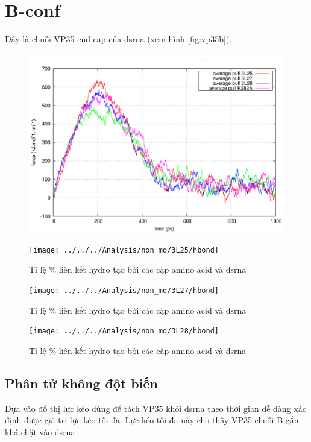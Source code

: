 \documentclass[12pt,a4paper,reqno, oneside]{book}
\begin{document}
\section{B-conf}
Đây là chuỗi VP35 end-cap của \gls{dsrna} (xem hình \ref{fig:vp35b}).
	\begin{figure}[b!]
	\centering
	\includegraphics[width=1.0\textwidth,natwidth=610,natheight=642]{pullf}
	\caption{}
	\end{figure}

	\begin{figure}[t]
	\centering
	\texttt{[image: ../../../Analysis/non\_md/3L25/hbond]}
	\caption{Tỉ lệ \% liên kết hydro tạo bởi các cặp amino acid và \gls{dsrna}}
	\label{fig:hbond25}
	\end{figure}
	\begin{figure}[p]
	\centering
	\texttt{[image: ../../../Analysis/non\_md/3L27/hbond]}
	\caption{Tỉ lệ \% liên kết hydro tạo bởi các cặp amino acid và \gls{dsrna}}
	\label{fig:hbond27}
	\end{figure}
	\begin{figure}[p]
	\centering
	\texttt{[image: ../../../Analysis/non\_md/3L28/hbond]}
	\caption{Tỉ lệ \% liên kết hydro tạo bởi các cặp amino acid và \gls{dsrna}}
	\label{fig:hbond28}
	\end{figure}
	\subsection{Phân tử không đột biến}
\hspace{18pt}
	Dựa vào đồ thị lực kéo dùng để tách VP35 khỏi \gls{dsrna} theo thời gian dễ dàng xác định được giá trị lực kéo tối đa. Lực kéo tối đa này cho thấy VP35 chuỗi B gắn khá chặt vào \gls{dsrna} 
\end{document}
